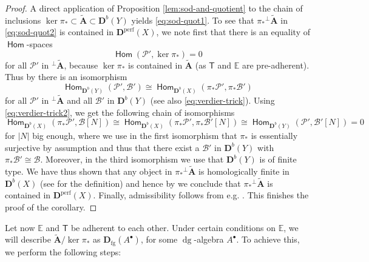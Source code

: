 \documentclass[a4paper,11pt, reqno]{amsart}
\def\E{\mathbb E}
\def\AA{\mathbf A}
\def\DD{\mathbf D}
\def\sB{\mathscr{B}}
\def\sP{\mathscr{P}}
\def\dg{{\operatorname{dg}}}
\newcommand{\opname}[1]{\operatorname{\mathsf{#1}}}
\newcommand{\Hom}{\opname{Hom}}
\def\Db{\DD^b}
\def\Dperf{\DD^{\mathrm{perf}}}
\newcommand{\bT}{\mathsf{T}}
\theoremstyle{plain}
\theoremstyle{definition}
\numberwithin{equation}{section}
\begin{document}
\begin{proof}
A direct application of Proposition \ref{lem:sod-and-quotient} to the chain of inclusions $\ker \pi_\ast \subset \tilde{\AA} \subset \Db (Y)$ yields \eqref{eq:sod-quot1}.   
To see that $  \pi_\ast{^{\perp}\tilde{\AA}}$ in \eqref{eq:sod-quot2} is contained in $  \Dperf(X)$, we note first that 
there is an equality of $\Hom$-spaces
\[
\Hom ( \sP ' , \ker \pi_\ast ) = 0
\]
for all $\sP '$ in $^{\perp}\tilde{\AA}$, because $\ker \pi_\ast $ is contained in $\tilde{\AA}$ (as $\bT$ and $\E$ are pre-adherent).
Thus by \cite[Proposition 5.3]{verdier} there is an isomorphism
\begin{equation}\label{eq:verdier-trick2}
    \Hom_{\Db(Y)} (\sP' , \sB' ) \cong \Hom_{\Db(X) } ( \pi_\ast \sP'  , \pi_\ast \sB'  ) 
\end{equation}
for all $\sP '$ in $^{\perp}\tilde{\AA}$ and all $\sB '$ in $\Db (Y)$ (see also \eqref{eq:verdier-trick}). 
Using \eqref{eq:verdier-trick2}, we get the following chain of isomorphisms
\[
\Hom_{\Db(X)} ( \pi_\ast \sP' , \sB [N] ) \cong \Hom_{\Db(X)} ( \pi_\ast \sP'  , \pi_\ast  \sB'  [N] ) \cong \Hom_{\Db(Y)}(\sP' , \sB' [N] ) = 0 
\]
for $|N| $ big enough, where we use in the first isomorphism that $\pi_\ast$ is essentially surjective by assumption and thus that there exist a $\sB'$ in $\Db(Y)$ with  $\pi_\ast  \sB' \cong  \sB$.
Moreover, in the third isomorphism we use that $\Db (Y)$ is of finite type.
We have thus shown that any object in $\pi_\ast  {^\perp}\tilde{\AA} $ is homologically finite in $\Db(X)$ (see \cite[Definition 1.6]{orlov-hf} for the definition) and hence by \cite[Proposition 1.11]{orlov-hf} we conclude that $\pi_\ast  {^\perp}\tilde{\AA} $ is contained in $\Dperf (X)$.
Finally, admissibility follows from e.g. \cite[Lemma 2.15]{KPS}.
This finishes the proof of the corollary.
\end{proof}



Let now $\E$ and $\bT$ be adherent to each other.
Under certain conditions on $\E$, we will describe $\tilde{\AA} / \ker\pi_\ast$ as $\DD_{\mathrm{fg}} ( A^\bullet )$, for some $\dg$-algebra $A^\bullet$. 
To achieve this, we perform the following steps:
\end{document}
